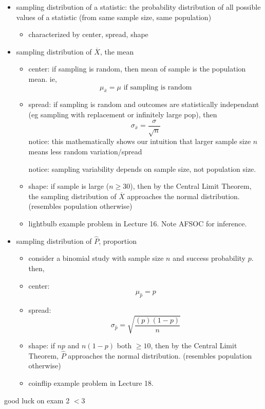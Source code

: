 \documentclass[11pt]{article}
\begin{document}
\begin{itemize}
  \item sampling distribution of a statistic: the probability distribution of all possible values of a statistic (from same sample size, same population)
  \begin{itemize}
    \item characterized by center, spread, shape
  \end{itemize}
  \item sampling distribution of $\overline{X}$, the mean
  \begin{itemize}
    \item center: if sampling is random, then mean of sample is the population mean. ie,
    \[ \mu_{\overline{x}} = \mu \text{ if sampling is random}\]
    \item spread: if sampling is random and outcomes are statistically independant (eg sampling with replacement or infinitely large pop), then 
    \[ \sigma_{\overline{x}}=\frac{\sigma}{\sqrt{n}} \]
    notice: this mathematically shows our intuition that larger sample size $n$ means less random variation/spread

    notice: sampling variability depends on sample size, not population size.
    \item shape: if sample is large ($n\ge 30$), then by the Central Limit Theorem, the sampling distribution of $\overline{X}$ approaches the normal distribution. (resembles population otherwise)
    \item lightbulb example problem in Lecture 16. Note AFSOC for inference.
  \end{itemize}
  \item sampling distribution of $\hat{P}$, proportion
  \begin{itemize}
    \item consider a binomial study with sample size $n$ and success probability $p$. then,
    \item center: 
    \[ \mu_{\hat{p}} = p \]
    \item spread: 
    \[ \sigma_{\hat{p}} = \sqrt{\frac{(p)(1-p)}{n}} \]
    \item shape: if $np$ and $n(1-p)$ both $\ge 10$, then by the Central Limit Theorem, $\hat{P}$ approaches the normal distribution. (resembles population otherwise)
    \item coinflip example problem in Lecture 18.
  \end{itemize}
\end{itemize}
good luck on exam 2 $<$3

\end{document}
